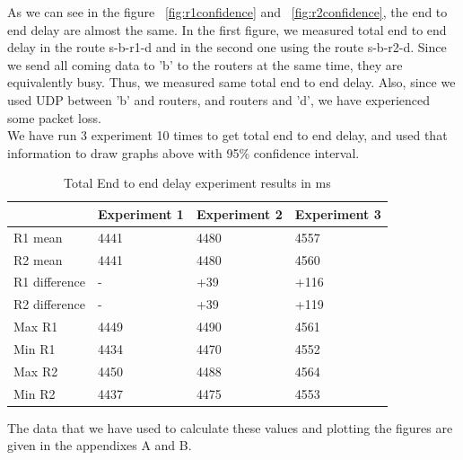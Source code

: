 \documentclass[12pt,journal,compsoc]{IEEEtran}
\begin{document}
As we can see in the figure ~\ref{fig:r1confidence} and ~\ref{fig:r2confidence}, the end to end delay are almost the same. In the first figure, we measured total end to end delay in the route s-b-r1-d and in the second one using the route s-b-r2-d. Since we send all coming data to 'b' to the routers at the same time, they are equivalently busy. Thus, we measured same total end to end delay. Also, since we used UDP between 'b' and routers, and routers and 'd', we have experienced some packet loss.\\
We have run 3 experiment 10 times to get total end to end delay, and used that information to draw graphs above with 95\% confidence interval.\\

\begin{table}[h!]
\begin{tabular}{|l|l|l|l|}
\hline
              & Experiment 1 & Experiment 2 & Experiment 3 \\ \hline
R1 mean       & 4441         & 4480         & 4557         \\ \hline
R2 mean       & 4441         & 4480         & 4560         \\ \hline
R1 difference & -            & +39          & +116         \\ \hline
R2 difference & -            & +39          & +119         \\ \hline
Max R1        & 4449         & 4490         & 4561         \\ \hline
Min R1        & 4434         & 4470         & 4552         \\ \hline
Max R2        & 4450         & 4488         & 4564         \\ \hline
Min R2        & 4437         & 4475         & 4553         \\ \hline
\end{tabular}
\captionsetup{justification=centering}
\caption{Total End to end delay experiment results in ms}
\label{tab:e2eresults}
\end{table}

The data that we have used to calculate these values and plotting the figures are given in the appendixes A and B.\\
\end{document}
